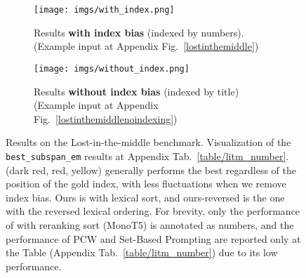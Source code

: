 
\begin{figure*}[!h]
{
\centering
    
    \begin{subfigure}[b]{\textwidth}
        \centering
        \texttt{[image: imgs/with\_index.png]}
        \caption{Results \textbf{with index bias} (indexed by numbers). (Example input at Appendix Fig.~\ref{lostinthemiddle})}
        \label{fig:litm_with_index}
    \end{subfigure}
    
    \vspace{2ex}
    
    \begin{subfigure}[b]{\textwidth}
        \centering
        \texttt{[image: imgs/without\_index.png]}
        \caption{Results \textbf{without index bias} (indexed by title) (Example input at Appendix Fig.~\ref{lostinthemiddlenoindexing})}
        \label{fig:litm_no_index}
    \end{subfigure}
    
    \caption{Results on the Lost-in-the-middle benchmark. Visualization of the \texttt{best\_subspan\_em} results at Appendix Tab.~\ref{table/litm_number}. \ours{} (dark red, red, yellow) generally performs the best regardless of the position of the gold index, with less fluctuations when we remove index bias. Ours is \ours{} with lexical sort, and ours-reversed is the one with the reversed lexical ordering. For brevity, only the performance of \ours{} with reranking sort (MonoT5) is annotated as numbers, and the performance of PCW and Set-Based Prompting are reported only at the Table (Appendix Tab.~\ref{table/litm_number}) due to its low performance.}
    \label{fig:litm}
}
\end{figure*}